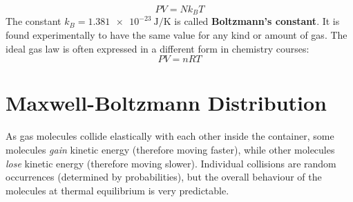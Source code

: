 \begin{equation}
  \boxed{PV=Nk_BT}
\end{equation}
The constant $k_B=\SI{1.381e-23}{\joule\per\kelvin}$ is called
\textbf{Boltzmann's constant}. It is found experimentally to have the same
value for any kind or amount of gas.
%
%
%
%
The ideal gas law is often expressed in a different form in chemistry courses:  
\begin{equation}
  \boxed{PV=nRT}
\end{equation}
%
%
%
%
%
\section{Maxwell-Boltzmann Distribution}

As gas molecules collide elastically with each other inside the container,
some molecules \emph{gain} kinetic energy (therefore moving faster), while
other molecules \emph{lose} kinetic energy (therefore moving slower).
Individual collisions are random occurrences (determined by probabilities), but
the overall behaviour of the molecules at thermal equilibrium is very
predictable.

